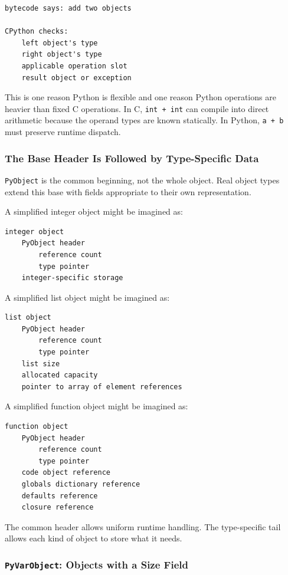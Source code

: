 \begin{verbatim}
bytecode says: add two objects

CPython checks:
    left object's type
    right object's type
    applicable operation slot
    result object or exception
\end{verbatim}

This is one reason Python is flexible and one reason Python operations are heavier than fixed C operations. In C, \texttt{int + int} can compile into direct arithmetic because the operand types are known statically. In Python, \texttt{a + b} must preserve runtime dispatch.

\subsubsection*{The Base Header Is Followed by Type-Specific Data}

\texttt{PyObject} is the common beginning, not the whole object. Real object types extend this base with fields appropriate to their own representation.

A simplified integer object might be imagined as:

\begin{verbatim}
integer object
    PyObject header
        reference count
        type pointer
    integer-specific storage
\end{verbatim}

A simplified list object might be imagined as:

\begin{verbatim}
list object
    PyObject header
        reference count
        type pointer
    list size
    allocated capacity
    pointer to array of element references
\end{verbatim}

A simplified function object might be imagined as:

\begin{verbatim}
function object
    PyObject header
        reference count
        type pointer
    code object reference
    globals dictionary reference
    defaults reference
    closure reference
\end{verbatim}

The common header allows uniform runtime handling. The type-specific tail allows each kind of object to store what it needs.

\subsubsection*{\texttt{PyVarObject}: Objects with a Size Field}

